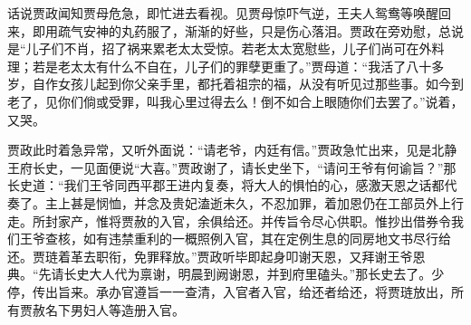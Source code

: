 


\begin{parag}
    话说贾政闻知贾母危急，即忙进去看视。见贾母惊吓气逆，王夫人鸳鸯等唤醒回来，即用疏气安神的丸药服了，渐渐的好些，只是伤心落泪。贾政在旁劝慰，总说是“儿子们不肖，招了祸来累老太太受惊。若老太太宽慰些，儿子们尚可在外料理；若是老太太有什么不自在，儿子们的罪孽更重了。”贾母道：“我活了八十多岁，自作女孩儿起到你父亲手里，都托着祖宗的福，从没有听见过那些事。如今到老了，见你们倘或受罪，叫我心里过得去么！倒不如合上眼随你们去罢了。”说着，又哭。
\end{parag}


\begin{parag}
    贾政此时着急异常，又听外面说：“请老爷，内廷有信。”贾政急忙出来，见是北静王府长史，一见面便说“大喜。”贾政谢了，请长史坐下，“请问王爷有何谕旨？”那长史道：“我们王爷同西平郡王进内复奏，将大人的惧怕的心，感激天恩之话都代奏了。主上甚是悯恤，并念及贵妃溘逝未久，不忍加罪，着加恩仍在工部员外上行走。所封家产，惟将贾赦的入官，余俱给还。并传旨令尽心供职。惟抄出借券令我们王爷查核，如有违禁重利的一概照例入官，其在定例生息的同房地文书尽行给还。贾琏着革去职衔，免罪释放。”贾政听毕即起身叩谢天恩，又拜谢王爷恩典。“先请长史大人代为禀谢，明晨到阙谢恩，并到府里磕头。”那长史去了。少停，传出旨来。承办官遵旨一一查清，入官者入官，给还者给还，将贾琏放出，所有贾赦名下男妇人等造册入官。
\end{parag}


